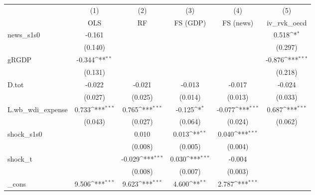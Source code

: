 {
\def\sym#1{\ifmmode^{#1}\else\(^{#1}\)\fi}
\begin{tabular}{l*{5}{c}}
\toprule
            &\multicolumn{1}{c}{(1)}&\multicolumn{1}{c}{(2)}&\multicolumn{1}{c}{(3)}&\multicolumn{1}{c}{(4)}&\multicolumn{1}{c}{(5)}\\
            &\multicolumn{1}{c}{OLS}&\multicolumn{1}{c}{RF}&\multicolumn{1}{c}{FS (GDP)}&\multicolumn{1}{c}{FS (news)}&\multicolumn{1}{c}{iv\_rvk\_oecd}\\
\midrule
news\_s1s0   &      -0.161         &                     &                     &                     &       0.518\sym{*}  \\
            &     (0.140)         &                     &                     &                     &     (0.297)         \\
\addlinespace
gRGDP       &      -0.344\sym{**} &                     &                     &                     &      -0.876\sym{***}\\
            &     (0.131)         &                     &                     &                     &     (0.218)         \\
\addlinespace
D.tot       &      -0.022         &      -0.021         &      -0.013         &      -0.017         &      -0.024         \\
            &     (0.027)         &     (0.025)         &     (0.014)         &     (0.013)         &     (0.033)         \\
\addlinespace
L.wb\_wdi\_expense&       0.733\sym{***}&       0.765\sym{***}&      -0.125\sym{*}  &      -0.077\sym{***}&       0.687\sym{***}\\
            &     (0.043)         &     (0.027)         &     (0.064)         &     (0.024)         &     (0.062)         \\
\addlinespace
shock\_s1s0  &                     &       0.010         &       0.013\sym{**} &       0.040\sym{***}&                     \\
            &                     &     (0.008)         &     (0.005)         &     (0.004)         &                     \\
\addlinespace
shock\_t     &                     &      -0.029\sym{***}&       0.030\sym{***}&      -0.004         &                     \\
            &                     &     (0.008)         &     (0.007)         &     (0.003)         &                     \\
\addlinespace
\_cons      &       9.506\sym{***}&       9.623\sym{***}&       4.600\sym{**} &       2.787\sym{***}&                     \\

\end{tabular}}
